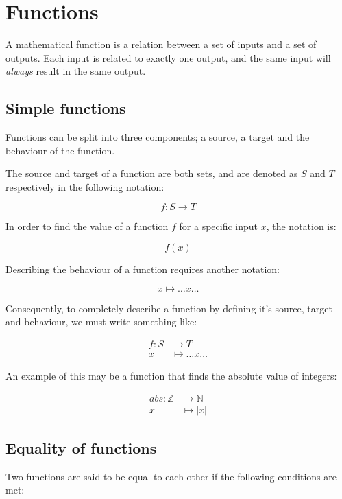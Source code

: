 
\section{Functions}

A mathematical function is a relation between a set of inputs and a set of
outputs. Each input is related to exactly one output, and the same input will
{\it always} result in the same output.

\subsection{Simple functions}

Functions can be split into three components; a source, a target and the
behaviour of the function.

The source and target of a function are both sets, and are denoted as $S$ and
$T$ respectively in the following notation:

\[
	f:S \rightarrow T
\]

In order to find the value of a function $f$ for a specific input $x$, the
notation is:

\[
	f(x)
\]

Describing the behaviour of a function requires another notation:

\[
	x \longmapsto \dots x \dots
\]

Consequently, to completely describe a function by defining it's source, target
and behaviour, we must write something like:

\[
	\begin{split}
	f:S &\rightarrow T\\
	x &\longmapsto \dots x \dots
	\end{split}
\]

An example of this may be a function that finds the absolute value of integers:

\[
	\begin{split}
	abs:\mathbb{Z} &\rightarrow \mathbb{N}\\
	x &\longmapsto |x|
	\end{split}	
\]

\subsection{Equality of functions}

Two functions are said to be equal to each other if the following conditions are
met:

